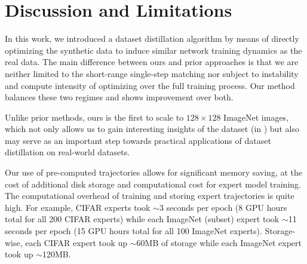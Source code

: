 \documentclass[main.tex]{subfiles}
\begin{document}
\section{Discussion and Limitations}
In this work, we introduced a dataset distillation algorithm by means of directly optimizing the synthetic data to induce similar network training dynamics as the real data.  The main difference between ours and prior approaches is that we are neither limited to the short-range single-step matching nor subject to instability and compute intensity of optimizing over the full training process. Our method balances these two regimes and shows improvement over both. 

Unlike prior methods, ours is the first to scale to $128\times 128$ ImageNet images, which not only allows us to gain interesting insights of the dataset (\eg in ) but also may serve as an important step towards practical applications of dataset distillation on real-world datasets. 

 Our use of pre-computed trajectories allows for significant memory saving, at the cost of additional disk storage and computational cost for expert model training. The computational overhead of training and storing expert trajectories is
quite high. For example, CIFAR experts took $\sim$3 seconds per epoch (8 GPU hours total for all 200 CIFAR experts) while each ImageNet (subset) expert took $\sim$11 seconds per epoch (15 GPU hours total for all 100 ImageNet experts). Storage-wise, each CIFAR expert took up $\sim$60MB of storage while each ImageNet expert took up $\sim$120MB.
\end{document}
